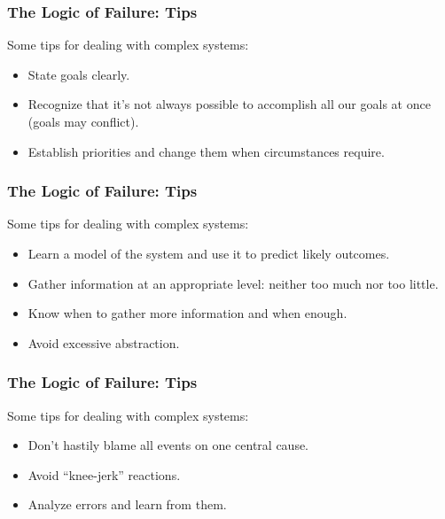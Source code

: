 \begin{frame}
\frametitle{The Logic of Failure: Tips}
\begin{changemargin}{1cm}
 Some tips for dealing with complex systems:
 
\begin{itemize}
	\item State goals clearly.
	\item Recognize that it's not always possible to accomplish all our goals at once (goals may conflict).
	\item Establish priorities and change them when circumstances require.
\end{itemize}

\end{changemargin}
\end{frame}


\begin{frame}
\frametitle{The Logic of Failure: Tips}
\begin{changemargin}{1cm}
 Some tips for dealing with complex systems:
 
\begin{itemize}
	\item Learn a model of the system and use it to predict likely outcomes.
	\item Gather information at an appropriate level: neither too much nor too little.
	\item Know when to gather more information and when enough. 
	\item Avoid excessive abstraction.
\end{itemize}

\end{changemargin}
\end{frame}

\begin{frame}
\frametitle{The Logic of Failure: Tips}
\begin{changemargin}{1cm}
 Some tips for dealing with complex systems:
 
\begin{itemize}
	\item Don't hastily blame all events on one central cause.
	\item Avoid ``knee-jerk'' reactions.
	\item Analyze errors and learn from them.
\end{itemize}

\end{changemargin}
\end{frame}

